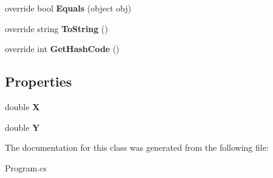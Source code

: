 \begin{DoxyCompactItemize}
\item 
\hypertarget{class_console_application2_1_1_vector_a83828a23f1a3938f05c0d2afb5d0c8bb}{}override bool {\bfseries Equals} (object obj)\label{class_console_application2_1_1_vector_a83828a23f1a3938f05c0d2afb5d0c8bb}

\item 
\hypertarget{class_console_application2_1_1_vector_a652f7596db2c6fe1c6bb28a399d6ffc1}{}override string {\bfseries To\+String} ()\label{class_console_application2_1_1_vector_a652f7596db2c6fe1c6bb28a399d6ffc1}

\item 
\hypertarget{class_console_application2_1_1_vector_aa6ffae8d1611d9fdf8805f945889df86}{}override int {\bfseries Get\+Hash\+Code} ()\label{class_console_application2_1_1_vector_aa6ffae8d1611d9fdf8805f945889df86}

\end{DoxyCompactItemize}
\subsection*{Properties}
\begin{DoxyCompactItemize}
\item 
\hypertarget{class_console_application2_1_1_vector_a80fde222448cb457c273e5c58448b974}{}double {\bfseries X}\label{class_console_application2_1_1_vector_a80fde222448cb457c273e5c58448b974}

\item 
\hypertarget{class_console_application2_1_1_vector_ae9522fa1917a1201a2ce3e450ad304d3}{}double {\bfseries Y}\label{class_console_application2_1_1_vector_ae9522fa1917a1201a2ce3e450ad304d3}

\end{DoxyCompactItemize}


The documentation for this class was generated from the following file\+:\begin{DoxyCompactItemize}
\item 
Program.\+cs\end{DoxyCompactItemize}
